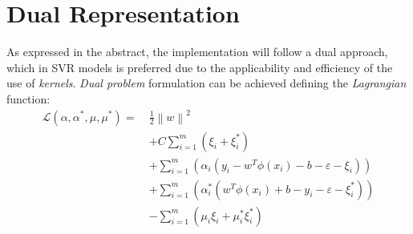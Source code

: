 \documentclass[12pt]{article}
\newcommand{\norm}[1]{\left\lVert#1\right\rVert}
\newcommand{\Lagr}{\mathcal{L}}
\begin{document}
	\section{Dual Representation}
	As expressed in the abstract, the implementation will follow a dual approach, which in SVR models is preferred due to the applicability and efficiency of the use of \textit{kernels}. \textit{Dual problem} formulation can be achieved defining the \textit{Lagrangian} function:
	\begin{equation}\label{eq:4}
	\begin{aligned}
		\Lagr(\alpha,\alpha^*,\mu,\mu^*) =  \ &\frac{1}{2}\norm{w}^2\\
		&+C\sum_{i=1}^{m}(\xi_{i} + \xi_{i}^*) \\
		&+ \sum_{i=1}^{m}(\alpha_i(y_i - w^T\phi(x_i) - b - \varepsilon - \xi_i))\\
		&+ \sum_{i=1}^{m}(\alpha_i^*(w^T\phi(x_i) + b - y_i - \varepsilon - \xi_i^*)) \\
		&- \sum_{i=1}^{m}(\mu_i\xi_i + \mu_i^*\xi_i^*)
	\end{aligned}
	\end{equation}
\end{document}
